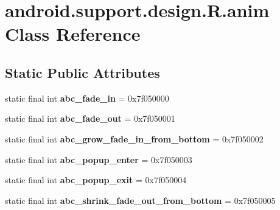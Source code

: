 \hypertarget{classandroid_1_1support_1_1design_1_1_r_1_1anim}{}\section{android.\+support.\+design.\+R.\+anim Class Reference}
\label{classandroid_1_1support_1_1design_1_1_r_1_1anim}
\subsection*{Static Public Attributes}
\begin{DoxyCompactItemize}
\item 
\hypertarget{classandroid_1_1support_1_1design_1_1_r_1_1anim_ad1aab55327ed71f67234994b071ab794}{}static final int {\bfseries abc\+\_\+fade\+\_\+in} = 0x7f050000\label{classandroid_1_1support_1_1design_1_1_r_1_1anim_ad1aab55327ed71f67234994b071ab794}

\item 
\hypertarget{classandroid_1_1support_1_1design_1_1_r_1_1anim_a8773dce408c4627fa162cb820d04f0da}{}static final int {\bfseries abc\+\_\+fade\+\_\+out} = 0x7f050001\label{classandroid_1_1support_1_1design_1_1_r_1_1anim_a8773dce408c4627fa162cb820d04f0da}

\item 
\hypertarget{classandroid_1_1support_1_1design_1_1_r_1_1anim_aa783dc7f4ea2b32ab95bce1ed298d369}{}static final int {\bfseries abc\+\_\+grow\+\_\+fade\+\_\+in\+\_\+from\+\_\+bottom} = 0x7f050002\label{classandroid_1_1support_1_1design_1_1_r_1_1anim_aa783dc7f4ea2b32ab95bce1ed298d369}

\item 
\hypertarget{classandroid_1_1support_1_1design_1_1_r_1_1anim_abbdbb94547e7204418714ef8fbd684c0}{}static final int {\bfseries abc\+\_\+popup\+\_\+enter} = 0x7f050003\label{classandroid_1_1support_1_1design_1_1_r_1_1anim_abbdbb94547e7204418714ef8fbd684c0}

\item 
\hypertarget{classandroid_1_1support_1_1design_1_1_r_1_1anim_a233cdba0ad27e14b39b7edbb3c3ecf60}{}static final int {\bfseries abc\+\_\+popup\+\_\+exit} = 0x7f050004\label{classandroid_1_1support_1_1design_1_1_r_1_1anim_a233cdba0ad27e14b39b7edbb3c3ecf60}

\item 
\hypertarget{classandroid_1_1support_1_1design_1_1_r_1_1anim_a84c97609991229557250b451bec9739a}{}static final int {\bfseries abc\+\_\+shrink\+\_\+fade\+\_\+out\+\_\+from\+\_\+bottom} = 0x7f050005\label{classandroid_1_1support_1_1design_1_1_r_1_1anim_a84c97609991229557250b451bec9739a}


\end{DoxyCompactItemize}
